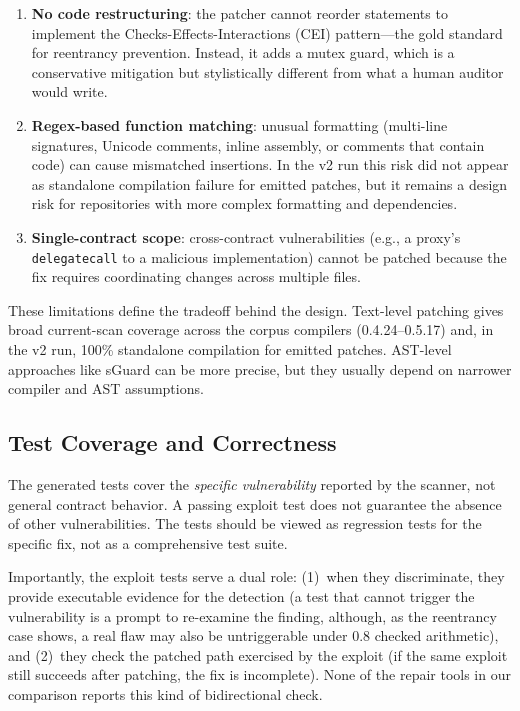 \documentclass[conference]{IEEEtran}
\begin{document}
\begin{enumerate}
    \item \textbf{No code restructuring}: the patcher cannot reorder statements to implement the Checks-Effects-Interactions (CEI) pattern---the gold standard for reentrancy prevention. Instead, it adds a mutex guard, which is a conservative mitigation but stylistically different from what a human auditor would write.
    \item \textbf{Regex-based function matching}: unusual formatting (multi-line signatures, Unicode comments, inline assembly, or comments that contain code) can cause mismatched insertions. In the v2 run this risk did not appear as standalone compilation failure for emitted patches, but it remains a design risk for repositories with more complex formatting and dependencies.
    \item \textbf{Single-contract scope}: cross-contract vulnerabilities (e.g., a proxy's \texttt{delegatecall} to a malicious implementation) cannot be patched because the fix requires coordinating changes across multiple files.
\end{enumerate}

These limitations define the tradeoff behind the design. Text-level patching gives broad current-scan coverage across the corpus compilers (0.4.24--0.5.17) and, in the v2 run, 100\% standalone compilation for emitted patches. AST-level approaches like sGuard can be more precise, but they usually depend on narrower compiler and AST assumptions.

\subsection{Test Coverage and Correctness}

The generated tests cover the \emph{specific vulnerability} reported by the scanner, not general contract behavior. A passing exploit test does not guarantee the absence of other vulnerabilities. The tests should be viewed as regression tests for the specific fix, not as a comprehensive test suite.

Importantly, the exploit tests serve a dual role: (1)~when they discriminate, they provide executable evidence for the detection (a test that cannot trigger the vulnerability is a prompt to re-examine the finding, although, as the reentrancy case shows, a real flaw may also be untriggerable under 0.8 checked arithmetic), and (2)~they check the patched path exercised by the exploit (if the same exploit still succeeds after patching, the fix is incomplete). None of the repair tools in our comparison reports this kind of bidirectional check.
\end{document}
